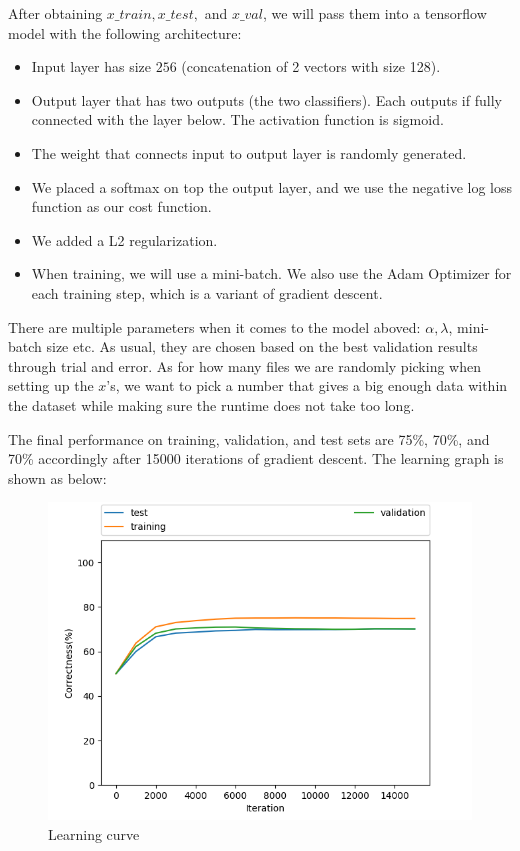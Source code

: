 \documentclass[11pt,twoside]{article}
\begin{document}
After obtaining $x\_train, x\_test,$ and $x\_val$, we will pass them into a tensorflow model with the following architecture:
\begin {itemize}
	\item Input layer has size $256$ (concatenation of 2 vectors with size 128).
	\item Output layer that has two outputs (the two classifiers). Each outputs if fully connected with the layer below. The activation function is sigmoid.
	\item The weight that connects input to output layer is randomly generated.
	\item We placed a softmax on top the output layer, and we use the negative log loss function as our cost function.
	\item We added a L2 regularization.
	\item When training, we will use a mini-batch. We also use the Adam Optimizer for each training step, which is a variant of gradient descent.
\end {itemize}

There are multiple parameters when it comes to the model aboved: $\alpha, \lambda$, mini-batch size etc. As usual, they are chosen based on the best validation results through trial and error. As for how many files we are randomly picking when setting up the $x$'s, we want to pick a number that gives a big enough data within the dataset while making sure the runtime does not take too long.

The final performance on training, validation, and test sets are 75\%, 70\%, and 70\% accordingly after 15000 iterations of gradient descent. The learning graph is shown as below:

\begin{figure}[h]
	\centering
	\includegraphics[scale=0.8]{part7.png}
	\caption*{Learning curve}
\end{figure}
\end{document}
